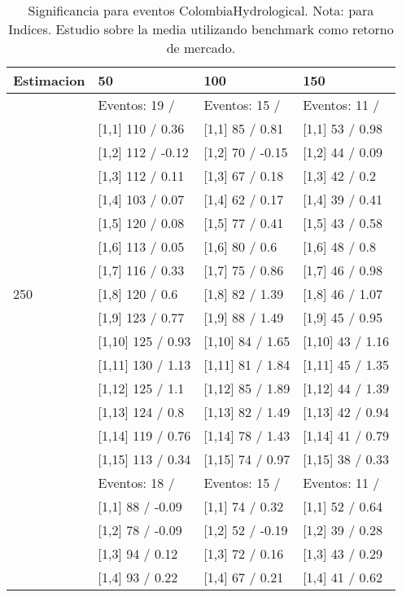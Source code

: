 \begin{table}

\caption{Significancia para eventos ColombiaHydrological. Nota: para Indices. Estudio sobre la media utilizando benchmark como retorno de mercado.}
\centering
\begin{tabular}[t]{llll}
\toprule
Estimacion & 50 & 100 & 150\\
\midrule
 & Eventos:  19 / & Eventos:  15 / & Eventos:  11 /\\
 & {}[1,1] 110  / 0.36 & {}[1,1] 85  / 0.81 & {}[1,1] 53  / 0.98\\
 & {}[1,2] 112  / -0.12 & {}[1,2] 70  / -0.15 & {}[1,2] 44  / 0.09\\
 & {}[1,3] 112  / 0.11 & {}[1,3] 67  / 0.18 & {}[1,3] 42  / 0.2\\
 & {}[1,4] 103  / 0.07 & {}[1,4] 62  / 0.17 & {}[1,4] 39  / 0.41\\
\addlinespace
 & {}[1,5] 120  / 0.08 & {}[1,5] 77  / 0.41 & {}[1,5] 43  / 0.58\\
 & {}[1,6] 113  / 0.05 & {}[1,6] 80  / 0.6 & {}[1,6] 48  / 0.8\\
 & {}[1,7] 116  / 0.33 & {}[1,7] 75  / 0.86 & {}[1,7] 46  / 0.98\\
250 & {}[1,8] 120  / 0.6 & {}[1,8] 82  / 1.39 & {}[1,8] 46  / 1.07\\
 & {}[1,9] 123  / 0.77 & {}[1,9] 88  / 1.49 & {}[1,9] 45  / 0.95\\
\addlinespace
 & {}[1,10] 125  / 0.93 & {}[1,10] 84  / 1.65 & {}[1,10] 43  / 1.16\\
 & {}[1,11] 130  / 1.13 & {}[1,11] 81  / 1.84 & {}[1,11] 45  / 1.35\\
 & {}[1,12] 125  / 1.1 & {}[1,12] 85  / 1.89 & {}[1,12] 44  / 1.39\\
 & {}[1,13] 124  / 0.8 & {}[1,13] 82  / 1.49 & {}[1,13] 42  / 0.94\\
 & {}[1,14] 119  / 0.76 & {}[1,14] 78  / 1.43 & {}[1,14] 41  / 0.79\\
\addlinespace
 & {}[1,15] 113  / 0.34 & {}[1,15] 74  / 0.97 & {}[1,15] 38  / 0.33\\
 & Eventos:  18 / & Eventos:  15 / & Eventos:  11 /\\
 & {}[1,1] 88  / -0.09 & {}[1,1] 74  / 0.32 & {}[1,1] 52  / 0.64\\
 & {}[1,2] 78  / -0.09 & {}[1,2] 52  / -0.19 & {}[1,2] 39  / 0.28\\
 & {}[1,3] 94  / 0.12 & {}[1,3] 72  / 0.16 & {}[1,3] 43  / 0.29\\
\addlinespace
 & {}[1,4] 93  / 0.22 & {}[1,4] 67  / 0.21 & {}[1,4] 41  / 0.62\\

\end{tabular}
\end{table}
